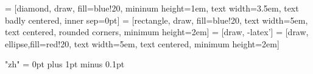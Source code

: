 

\usepackage{ulem}
\usepackage{mathcomp}  %
\usepackage{tikz}
\usepackage{smartdiagram}
\usetikzlibrary{shapes,arrows}
\usetikzlibrary{snakes}



 = [diamond, draw, fill=blue!20, mininum height=1em,
   text width=3.5em, text badly centered, inner sep=0pt]
 = [rectangle, draw, fill=blue!20,
   text width=5em, text centered, rounded corners, minimum height=2em]
 = [draw, -latex']
 = [draw, ellipse,fill=red!20, text width=5em, text centered,
   minimum height=2em]

   \usepackage{tabularx}
\usepackage[no-math]{fontspec}

\usepackage{xeCJK}                       %
\usepackage{xunicode,xltxtra,beamerthemesplit}

\makeatletter %
\def\@cite#1#2{\textsuperscript{[{#1\if@tempswa , #2\fi}]}}

\makeatletter %
\def\@cite#1#2{\textsuperscript{[{#1\if@tempswa , #2\fi}]}}

\setmainfont[BoldFont=Times New Roman]{Times New Roman} %

\setmonofont{YaHei_Monaco}






\XeTeXlinebreaklocale "zh" %
\XeTeXlinebreakskip = 0pt plus 1pt minus 0.1pt %


